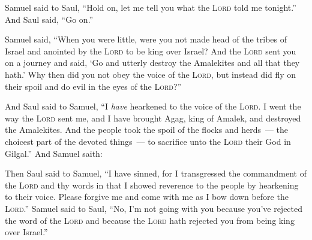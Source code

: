 \begin{inparaenum}
     Samuel said to Saul, ``Hold on, let me tell you what the \textsc{Lord} told me tonight.'' And Saul said, ``Go on.''%
    
     Samuel said, ``When you were little, were you not made head of the tribes of Israel and anointed by the \textsc{Lord} to be king over Israel?%
     And the \textsc{Lord} sent you on a journey and said, `Go and utterly destroy the Amalekites and all that they hath.'%
     Why then did you not obey the voice of the \textsc{Lord}, but instead did fly on their spoil and do evil in the eyes of the \textsc{Lord}?''%
    
     And Saul said to Samuel, ``I \emph{have} hearkened to the voice of the \textsc{Lord}. I went the way the \textsc{Lord} sent me, and I have brought Agag, king of Amalek, and destroyed the Amalekites.%
     And the people took the spoil of the flocks and herds~--- the choicest part of the devoted things~--- to sacrifice unto the \textsc{Lord} their God in Gilgal.''%
     And Samuel saith:%
    
    
    
    
    
     Then Saul said to Samuel, ``I have sinned, for I transgressed the commandment of the \textsc{Lord} and thy words in that I showed reverence to the people by hearkening to their voice.%
     Please forgive me and come with me as I bow down before the \textsc{Lord}.''%
     Samuel said to Saul, ``No, I'm not going with you because you've rejected the word of the \textsc{Lord} and because the \textsc{Lord} hath rejected you from being king over Israel.''%
    

\end{inparaenum}
